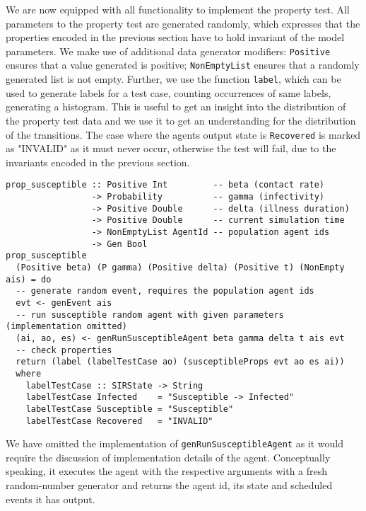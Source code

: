 We are now equipped with all functionality to implement the property test. All parameters to the property test are generated randomly, which expresses that the properties encoded in the previous section have to hold invariant of the model parameters. We make use of additional data generator modifiers: \texttt{Positive} ensures that a value generated is positive; \texttt{NonEmptyList} ensures that a randomly generated list is not empty. Further, we use the function \texttt{label}, which can be used to generate labels for a test case, counting occurrences of same labels, generating a histogram. This is useful to get an insight into the distribution of the property test data and we use it to get an understanding for the distribution of the transitions. The case where the agents output state is \texttt{Recovered} is marked as "INVALID" as it must never occur, otherwise the test will fail, due to the invariants encoded in the previous section.

\begin{footnotesize}
\begin{verbatim}
prop_susceptible :: Positive Int         -- beta (contact rate)
                 -> Probability          -- gamma (infectivity)
                 -> Positive Double      -- delta (illness duration)
                 -> Positive Double      -- current simulation time
                 -> NonEmptyList AgentId -- population agent ids
                 -> Gen Bool
prop_susceptible 
  (Positive beta) (P gamma) (Positive delta) (Positive t) (NonEmpty ais) = do
  -- generate random event, requires the population agent ids
  evt <- genEvent ais
  -- run susceptible random agent with given parameters (implementation omitted)
  (ai, ao, es) <- genRunSusceptibleAgent beta gamma delta t ais evt
  -- check properties
  return (label (labelTestCase ao) (susceptibleProps evt ao es ai))
  where
    labelTestCase :: SIRState -> String
    labelTestCase Infected    = "Susceptible -> Infected"
    labelTestCase Susceptible = "Susceptible"
    labelTestCase Recovered   = "INVALID"
\end{verbatim}
\end{footnotesize}

We have omitted the implementation of \texttt{genRunSusceptibleAgent} as it would require the discussion of implementation details of the agent. Conceptually speaking, it executes the agent with the respective arguments with a fresh random-number generator and returns the agent id, its state and scheduled events it has output.

